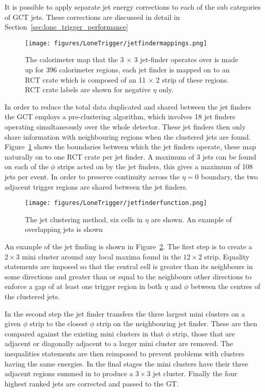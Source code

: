 It is possible to apply separate jet energy corrections to each of the sub 
categories of GCT jets. These corrections are discussed in detail in 
Section~\ref{sec:lone_trigger_performance}

\begin{figure}[ht]
  \centering    
  \texttt{[image: figures/LoneTrigger/jetfindermappings.png]}
  \caption{The calorimeter map that the 3 $\times$ 3 jet-finder operates over
   is made up for 396 calorimeter regions, each jet finder is mapped on to an 
   RCT crate which is composed of an 11 $\times$ 2 strip of these regions. RCT
   crate labels are shown for negative $\eta$ only. }
  \label{fig:figures_LoneTrigger_jetfindermappings}
\end{figure}

In order to reduce the total data duplicated and shared between the jet finders
the GCT employs a pre-clustering algorithm, which involves 18 jet finders 
operating simultaneously over the whole detector. These jet finders then only
share information with neighbouring regions when the clustered jets are found.
Figure~\ref{fig:figures_LoneTrigger_jetfindermappings} shows the boundaries 
between which the jet finders operate, these map naturally on to one RCT crate 
per jet finder. A maximum of 3 jets can be found on each of the $\phi$ strips
acted on by the jet finders, this gives a maximum of 108 jets per event. In
order to preserve continuity across the $\eta = 0$ boundary, the two adjacent
trigger regions are shared between the jet finders.


\begin{figure}[ht]
  \centering
 \texttt{[image: figures/LoneTrigger/jetfinderfunction.png]}
  \caption{The \Lone jet clustering method, six cells in $\eta$ are shown. An
  example of overlapping jets is shown}
  \label{fig:figures_LoneTrigger_jetfinderfunction}
\end{figure}


An example of the jet finding is shown in
Figure~\ref{fig:figures_LoneTrigger_jetfinderfunction}. The first step is to 
create a $2 \times 3$ mini cluster around any local maxima found in the $12 
\times 2$ strip. Equality statements are imposed so that the central cell is 
greater than its neighbours in some directions and greater than or equal to the 
neighbours other directions to enforce a gap of at least one trigger region in 
both $\eta$ and $\phi$ between the centres of the clustered jets.

In the second step the jet finder transfers the three largest mini clusters on 
a given $\phi$ strip to the closest $\phi$ strip on the neighbouring jet finder.
These are then compared against the existing mini clusters in that $\phi$ strip,
those that are adjacent or diagonally adjacent to a larger mini cluster are 
removed. The inequalities statements are then reimposed to prevent problems
with clusters having the same energies. In the final stages the mini clusters
have their three adjacent regions summed in to produce a $3 \times 3$ jet
cluster. Finally the four highest ranked jets are corrected and passed to the 
GT.

